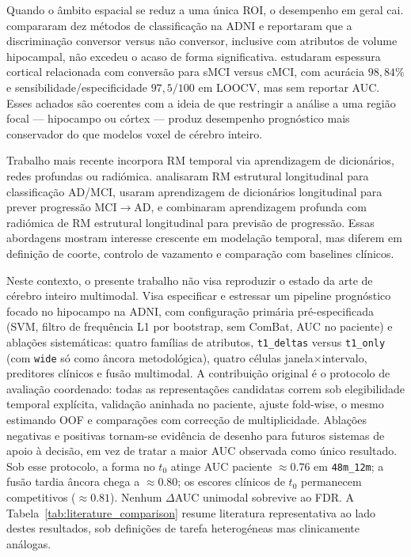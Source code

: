 \documentclass[review]{elsarticle}
\newcommand{\code}[1]{\texttt{#1}}
\begin{document}
Quando o âmbito espacial se reduz a uma única ROI, o desempenho em geral cai.
\citet{cuingnet-2011} compararam dez métodos de classificação na ADNI e reportaram que a discriminação conversor versus não conversor, inclusive com atributos de volume hipocampal, não excedeu o acaso de forma significativa.
\citet{guo-2017a} estudaram espessura cortical relacionada com conversão para sMCI versus cMCI, com acurácia $98{,}84\%$ e sensibilidade/especificidade $97{,}5/100$ em LOOCV, mas sem reportar AUC.
Esses achados são coerentes com a ideia de que restringir a análise a uma região focal --- hipocampo ou córtex --- produz desempenho prognóstico mais conservador do que modelos voxel de cérebro inteiro.

Trabalho mais recente incorpora RM temporal via aprendizagem de dicionários, redes profundas ou radiómica.
\citet{zhang-2019} analisaram RM estrutural longitudinal para classificação AD/MCI, \citet{lin-2020} usaram aprendizagem de dicionários longitudinal para prever progressão MCI$\to$AD, e \citet{aghajanian-2025} combinaram aprendizagem profunda com radiómica de RM estrutural longitudinal para previsão de progressão.
Essas abordagens mostram interesse crescente em modelação temporal, mas diferem em definição de coorte, controlo de vazamento e comparação com baselines clínicos.

Neste contexto, o presente trabalho não visa reproduzir o estado da arte de cérebro inteiro multimodal.
Visa especificar e estressar um pipeline prognóstico focado no hipocampo na ADNI, com configuração primária pré-especificada (SVM, filtro de frequência L1 por bootstrap, sem ComBat, AUC no paciente) e ablações sistemáticas: quatro famílias de atributos, \code{t1\_deltas} versus \code{t1\_only} (com \code{wide} só como âncora metodológica), quatro células janela$\times$intervalo, preditores clínicos e fusão multimodal.
A contribuição original é o protocolo de avaliação coordenado: todas as representações candidatas correm sob elegibilidade temporal explícita, validação aninhada no paciente, ajuste fold-wise, o mesmo estimando OOF e comparações com correcção de multiplicidade.
Ablações negativas e positivas tornam-se evidência de desenho para futuros sistemas de apoio à decisão, em vez de tratar a maior AUC observada como único resultado.
Sob esse protocolo, a forma no $t_0$ atinge AUC paciente $\approx 0.76$ em \code{48m\_12m}; a fusão tardia âncora chega a $\approx 0.80$; os escores clínicos de $t_0$ permanecem competitivos ($\approx 0.81$).
Nenhum $\Delta$AUC unimodal sobrevive ao FDR.
A Tabela~\ref{tab:literature_comparison} resume literatura representativa ao lado destes resultados, sob definições de tarefa heterogéneas mas clinicamente análogas.
	
\end{document}

